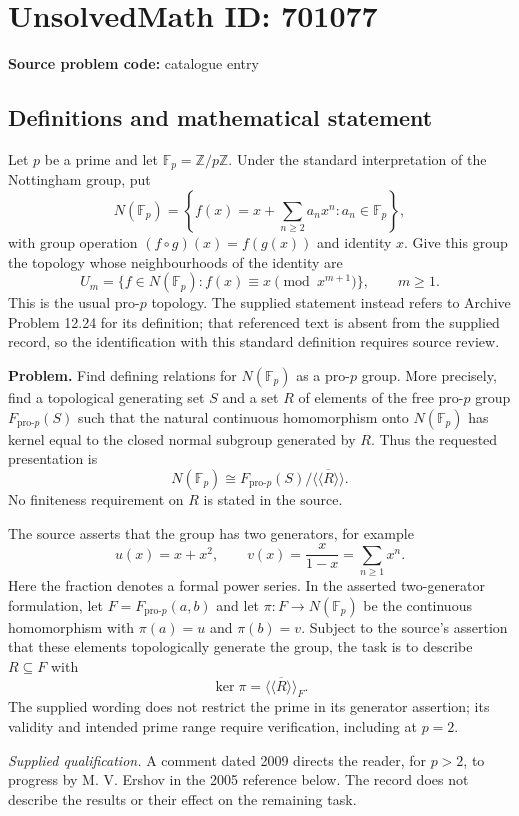 \documentclass[11pt]{article}
\newcommand{\Z}{\mathbb{Z}}
\newcommand{\F}{\mathbb{F}}
\begin{document}
\section*{UnsolvedMath ID: 701077}
\textbf{Source problem code:} catalogue entry
\subsection{Definitions and mathematical statement}
Let \(p\) be a prime and let \(\F_p=\Z/p\Z\). Under the standard interpretation of the Nottingham group, put
\[
N(\F_p)=\left\{f(x)=x+\sum_{n\geq 2}a_nx^n : a_n\in\F_p\right\},
\]
with group operation \((f\circ g)(x)=f(g(x))\) and identity \(x\). Give this group the topology whose neighbourhoods of the identity are
\[
U_m=\{f\in N(\F_p):f(x)\equiv x\pmod{x^{m+1}}\},\qquad m\geq 1.
\]
This is the usual pro-\(p\) topology. The supplied statement instead refers to Archive Problem 12.24 for its definition; that referenced text is absent from the supplied record, so the identification with this standard definition requires source review.

\textbf{Problem.} Find defining relations for \(N(\F_p)\) as a pro-\(p\) group. More precisely, find a topological generating set \(S\) and a set \(R\) of elements of the free pro-\(p\) group \(F_{\mathrm{pro}\text{-}p}(S)\) such that the natural continuous homomorphism onto \(N(\F_p)\) has kernel equal to the closed normal subgroup generated by \(R\). Thus the requested presentation is
\[
N(\F_p)\cong F_{\mathrm{pro}\text{-}p}(S)/\overline{\langle\!\langle R\rangle\!\rangle}.
\]
No finiteness requirement on \(R\) is stated in the source.

The source asserts that the group has two generators, for example
\[
u(x)=x+x^2,\qquad v(x)=\frac{x}{1-x}=\sum_{n\geq 1}x^n.
\]
Here the fraction denotes a formal power series. In the asserted two-generator formulation, let \(F=F_{\mathrm{pro}\text{-}p}(a,b)\) and let \(\pi:F\to N(\F_p)\) be the continuous homomorphism with \(\pi(a)=u\) and \(\pi(b)=v\). Subject to the source's assertion that these elements topologically generate the group, the task is to describe \(R\subseteq F\) with
\[
\ker\pi=\overline{\langle\!\langle R\rangle\!\rangle}_F.
\]
The supplied wording does not restrict the prime in its generator assertion; its validity and intended prime range require verification, including at \(p=2\).

\textit{Supplied qualification.} A comment dated 2009 directs the reader, for \(p>2\), to progress by M. V. Ershov in the 2005 reference below. The record does not describe the results or their effect on the remaining task.
\end{document}
